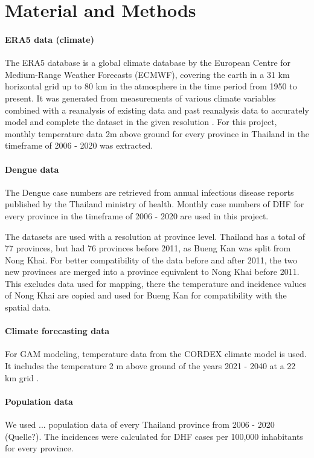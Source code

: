 \section{Material and Methods}

	\paragraph{ERA5 data (climate)}
	The ERA5 database is a global climate database by the European Centre for Medium-Range Weather Forecasts (ECMWF), covering the earth in a 31 km horizontal grid up to 80 km in the atmosphere in the time period from 1950 to present. It was generated from measurements of various climate variables combined with a reanalysis of existing data and past reanalysis data to accurately model and complete the dataset in the given resolution \citep{Hersbach2020}. For this project, monthly temperature data 2m above ground for every province in Thailand in the timeframe of 2006 - 2020 was extracted.
	\paragraph{Dengue data}
	The Dengue case numbers are retrieved from annual infectious disease reports published by the Thailand ministry of health. Monthly case numbers of DHF for every province in the timeframe of 2006 - 2020 are used in this project. 
	
	The datasets are used with a resolution at province level. Thailand has a total of 77 provinces, but had 76 provinces before 2011, as Bueng Kan was split from Nong Khai. For better compatibility of the data before and after 2011, the two new provinces are merged into a province equivalent to Nong Khai before 2011. This excludes data used for mapping, there the temperature and incidence values of Nong Khai are copied and used for Bueng Kan for compatibility with the spatial data. 
	\paragraph{Climate forecasting data}
	For GAM modeling, temperature  data from the CORDEX climate model is used. It includes the temperature 2 m above ground of the years 2021 - 2040 at a 22 km grid \citep{Copernicus2019}. 
	\paragraph{Population data}
	We used ... population data of every Thailand province from 2006 - 2020 (Quelle?). The incidences were calculated for DHF cases per 100,000 inhabitants for every province. 
